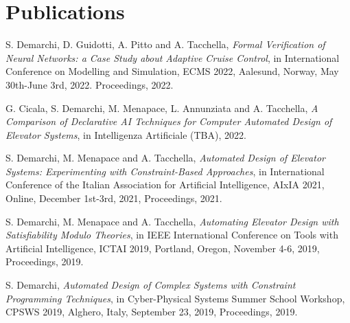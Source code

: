 \section{\sc Publications}

S. Demarchi, D. Guidotti, A. Pitto and A. Tacchella, \textit{Formal
	 Verification of Neural Networks: a Case Study about Adaptive 
	 Cruise Control}, in International Conference on Modelling and
Simulation, ECMS 2022, Aalesund, Norway, May 30th-June 3rd, 2022.
Proceedings, 2022.

G. Cicala, S. Demarchi, M. Menapace, L. Annunziata and A. Tacchella, \textit{A
	Comparison of Declarative AI Techniques for Computer Automated Design of
	Elevator Systems}, in Intelligenza Artificiale (TBA), 2022.

S. Demarchi, M. Menapace and A. Tacchella, \textit{Automated Design 
	of Elevator Systems: Experimenting with Constraint-Based 
	Approaches}, in International Conference of the Italian 
Association for Artificial Intelligence, AIxIA 2021, Online, 
December 1st-3rd, 2021, Proceedings, 2021.

S. Demarchi, M. Menapace and A. Tacchella, \textit{Automating Elevator 
	Design with Satisfiability Modulo Theories}, in IEEE International 
Conference on Tools with Artificial Intelligence, ICTAI 2019, Portland, 
Oregon, November 4-6, 2019, Proceedings, 2019.

S. Demarchi, \textit{Automated Design of Complex Systems with Constraint 
	Programming Techniques}, in Cyber-Physical Systems Summer School 
Workshop, CPSWS 2019, Alghero, Italy, September 23, 2019, Proceedings, 
2019.